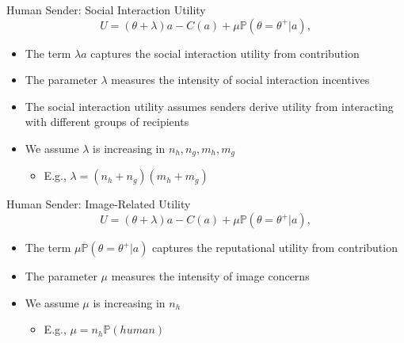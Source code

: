 \documentclass[9pt,aspectratio=1610]{beamer}
\begin{document}
\begin{frame}{Human Sender: Social Interaction Utility}
\begin{equation*}
    U = (\theta + \lambda )a - C(a) + \mu \mathbb{P}(\theta=\theta^+|a),
\end{equation*}
\vspace{.5em}

\begin{itemize}\setlength{\itemsep}{1em}
    \item The term $\lambda a$ captures the social interaction utility from contribution
    \item The parameter $\lambda$ measures the intensity of social interaction incentives
    \item The social interaction utility assumes senders derive utility from interacting with different groups of recipients 
    \item We assume $\lambda$ is increasing in $n_h,n_g,m_h,m_g$
    \vspace{.5em}
    \begin{itemize}
        \item E.g., $\lambda = (n_h+n_g)(m_h+m_g)$
    \end{itemize}
\end{itemize}
\end{frame}

\begin{frame}{Human Sender: Image-Related Utility}
\begin{equation*}
    U = (\theta + \lambda )a - C(a) + \mu \mathbb{P}(\theta=\theta^+|a),
\end{equation*}
\vspace{.5em}

\begin{itemize}\setlength{\itemsep}{1em}
    \item The term $\mu \mathbb{P}(\theta=\theta^+|a)$ captures the reputational utility from contribution
    \item The parameter $\mu$ measures the intensity of image concerns
    \item We assume $\mu$ is increasing in $n_h$
    \vspace{.5em}
    \begin{itemize}
        \item E.g., $\mu = n_h \mathbb{P}(human)$
    \end{itemize}
\end{itemize}
\end{frame}
\end{document}
